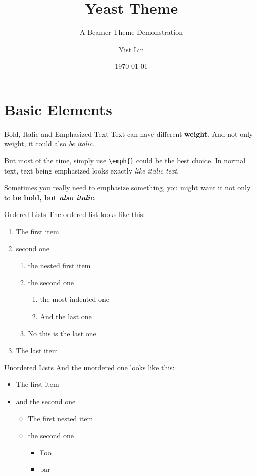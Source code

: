 \documentclass[10pt]{beamer}
\title{Yeast Theme}
\subtitle{A Beamer Theme Demonstration}
\author{Yist Lin}
\date{\today}
\begin{document}
\maketitle

\maketoc

\section{Basic Elements}

\begin{frame}{Bold, Italic and Emphasized Text}
  Text can have different \textbf{weight}.
  And not only weight, it could also \textit{be italic}.

  But most of the time, simply use \texttt{\textbackslash{}emph\{\}} could be the best choice.
  In normal text, text being emphasized looks exactly \emph{like italic text}.

  Sometimes you really need to emphasize something, you might want it not only to \textbf{be bold, but \textit{also italic}}.
\end{frame}

\begin{frame}{Ordered Lists}
  The ordered list looks like this:
  \begin{enumerate}
    \item The first item
    \item second one
          \begin{enumerate}
            \item the nested first item
            \item the second one
                  \begin{enumerate}
                    \item the most indented one
                    \item And the last one
                  \end{enumerate}
            \item No this is the last one
          \end{enumerate}
    \item The last item
  \end{enumerate}
\end{frame}

\begin{frame}{Unordered Lists}
  And the unordered one looks like this:
  \begin{itemize}
    \item The first item
    \item and the second one
          \begin{itemize}
            \item The first nested item
            \item the second one
                  \begin{itemize}
                    \item Foo
                    \item bar
                  \end{itemize}
          \end{itemize}
  \end{itemize}
\end{frame}
\end{document}
